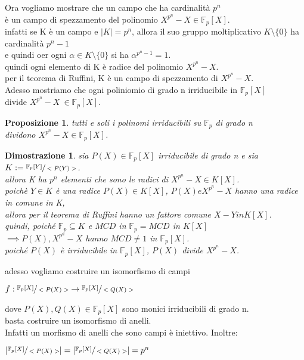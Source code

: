 \documentclass[a4paper,12pt]{article}
\theoremstyle{def}
\theoremstyle{prop}
\newtheorem*{proposition}{Proposizione}
\theoremstyle{esempio}
\theoremstyle{dimostrazione}
\newtheorem*{dimostrazione}{Dimostrazione}
\theoremstyle{teo}
\theoremstyle{osservazione}
\begin{document}
\newpage

Ora vogliamo mostrare che un campo che ha cardinalità \(p^n\)\\
è un campo di spezzamento del polinomio \(X^{p^n} - X \in \mathbb{F}_p[X]\).\\
infatti se K è un campo e \(|K| = p^n\), allora il suo gruppo moltiplicativo \(K \setminus \{0\}\) ha cardinalità \(p^n - 1\)\\
e quindi oer ogni \(\alpha \in K \setminus \{0\}\) si ha \(\alpha^{p^n - 1} = 1\).\\
quindi ogni elemento di K è radice del polinomio \(X^{p^n} - X\).\\
per il teorema di Ruffini, K è un campo di spezzamento di \(X^{p^n} - X\).\\
Adesso mostriamo che ogni poliniomio di grado n irriducibile in \(\mathbb{F}_p[X]\)\\
divide \(X^{p^n} - X\ \in \mathbb{F}_p[X]\).\\

\begin{proposition}
    tutti e soli i polinomi irriducibili su \(\mathbb{F}_p\) di grado n\\
    dividono \(X^{p^n} - X \in \mathbb{F}_p[X]\).
\end{proposition}

\begin{dimostrazione}
    sia \(P(X) \in \mathbb{F}_p[X]\) irriducibile di grado n e sia \(K := \sfrac{\mathbb{F}_p[Y]}{<P(Y)>}\).\\
    allora K ha \(p^n\) elementi che sono le radici di \(X^{p^n} - X \in K[X]\).\\
    poichè \(Y \in K\) è una radice \(P(X) \in K[X]\), \(P(X) e X^{p^n} - X\) hanno una radice in comune in K,\\
    allora per il teorema di Ruffini hanno un fattore comune \(X - Y in K[X]\).\\
    quindi, poiché \(\mathbb{F}_p \subseteq K\) e \(MCD\) in \(\mathbb{F}_p = MCD\) in \(K[X]\)\\
    \(\implies P(X), X^{p^n} - X\) hanno \(MCD \neq 1\) in \(\mathbb{F}_p[X]\).\\
    poiché \(P(X)\) è irriducibile in \(\mathbb{F}_p[X]\), \(P(X)\) divide \(X^{p^n} - X\).\\
\end{dimostrazione}

\vspace{\baselineskip}

adesso vogliamo costruire un isomorfismo di campi
\begin{center}
    \(f: \sfrac{\mathbb{F}_p[X]}{<P(X)>} \rightarrow \sfrac{\mathbb{F}_p[X]}{<Q(X)>}\)
\end{center}
dove \(P(X), Q(X) \in \mathbb{F}_p[X]\) sono monici irriducibili di grado n.\\
basta costruire un isomorfismo di anelli.\\
Infatti un morfismo di anelli che sono campi è iniettivo. Inoltre:
\begin{center}
    \(|\sfrac{\mathbb{F}_p[X]}{<P(X)>}| = |\sfrac{\mathbb{F}_p[X]}{<Q(X)>}| = p^n\)
\end{center}
\end{document}
